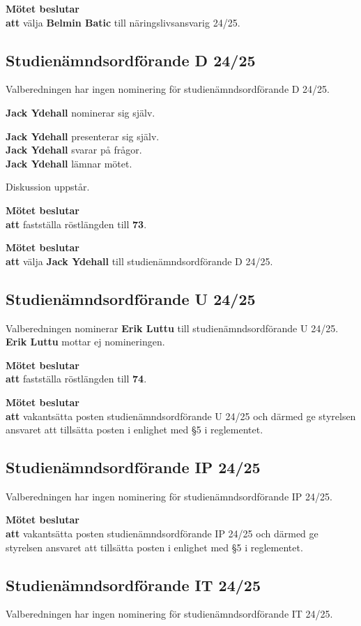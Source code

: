 \documentclass{datateknologsektionen-document}
\newcommand{\ind}{\hspace*{2em}}
\newcommand{\motetbeslutar}{\textbf{Mötet beslutar}}
\newcommand{\att}{\\\ind\textbf{att}}
\newcommand{\rostlangd}[1]{\motetbeslutar\att{} fastställa röstlängden till \textbf{#1}.}
\begin{document}
\motetbeslutar\att{} välja \textbf{Belmin Batic} till näringslivsansvarig 24/25.

\subsection{Studienämndsordförande D 24/25}

Valberedningen har ingen nominering för studienämndsordförande D 24/25.

\textbf{Jack Ydehall} nominerar sig själv.

\textbf{Jack Ydehall} presenterar sig själv.\\
\textbf{Jack Ydehall} svarar på frågor.\\
\textbf{Jack Ydehall} lämnar mötet.

Diskussion uppstår.

\rostlangd{73}

\motetbeslutar\att{} välja \textbf{Jack Ydehall} till studienämndsordförande D 24/25.

\subsection{Studienämndsordförande U 24/25}

Valberedningen nominerar \textbf{Erik Luttu} till studienämndsordförande U 24/25.\\
\textbf{Erik Luttu} mottar ej nomineringen.

\rostlangd{74}

\motetbeslutar\att{} vakantsätta posten studienämndsordförande U 24/25 och därmed ge styrelsen ansvaret att tillsätta posten i enlighet med §5 i reglementet.

\subsection{Studienämndsordförande IP 24/25}

Valberedningen har ingen nominering för studienämndsordförande IP 24/25.

\motetbeslutar\att{} vakantsätta posten studienämndsordförande IP 24/25 och därmed ge styrelsen ansvaret att tillsätta posten i enlighet med §5 i reglementet.

\subsection{Studienämndsordförande IT 24/25}

Valberedningen har ingen nominering för studienämndsordförande IT 24/25.
\end{document}
